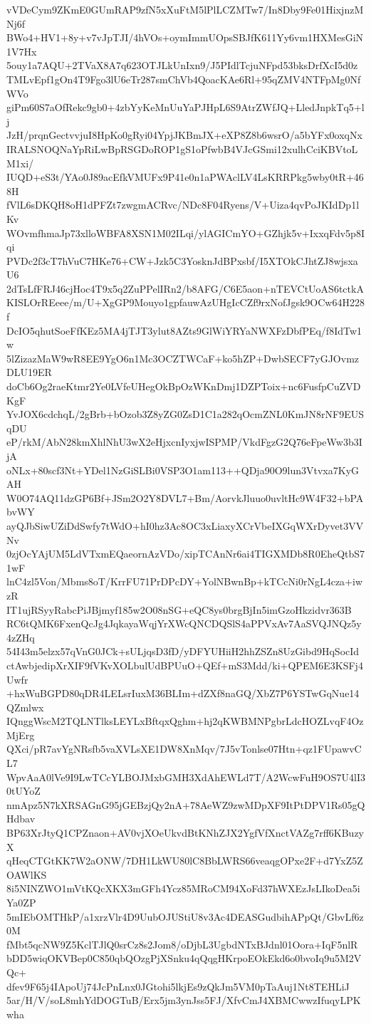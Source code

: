 vVDeCym9ZKmE0GUmRAP9zfN5xXuFtM5lPlLCZMTw7/In8Dby9Fe01HixjnzMNj6f
BWo4+HV1+8y+v7vJpTJI/4hVOs+oymImmUOpsSBJfK611Yy6vm1HXMesGiN1V7Hx
5ouy1a7AQU+2TVaX8A7q623OTJLkUnIxn9/J5PIdlTcjuNFpd53bksDrfXcI5d0z
TMLvEpf1gOn4T9Fgo3lU6eTr287smChVb4QoacKAe6Rl+95qZMV4NTFpMg0NfWVo
giPm60S7aOfRekc9gb0+4zbYyKeMnUuYaPJHpL6S9AtrZWfJQ+LledJnpkTq5+lj
JzH/prqnGectvvjuI8HpKo0gRyi04YpjJKBmJX+eXP8Z8b6wsrO/a5bYFx0oxqNx
IRALSNOQNaYpRiLwBpRSGDoROP1gS1oPfwbB4VJcGSmi12xulhCciKBVtoLM1xi/
IUQD+eS3t/YAo0J89acEfkVMUFx9P41e0n1aPWAclLV4LsKRRPkg5wby0tR+468H
fVlL6sDKQH8oH1dPFZt7zwgmACRvc/NDc8F04Ryens/V+Uiza4qvPoJKIdDp1lKv
WOvmfhmaJp73xlloWBFA8XSN1M02ILqi/ylAGICmYO+GZhjk5v+IxxqFdv5p8Iqi
PVDc2f3cT7hVuC7HKe76+CW+Jzk5C3YosknJdBPxsbf/I5XTOkCJhtZJ8wjsxaU6
2dTsLfFRJ46cjHoc4T9x5q2ZuPPelIRn2/b8AFG/C6E5aon+nTEVCtUoAS6tctkA
KISLOrREeee/m/U+XgGP9Mouyo1gpfauwAzUHgIcCZf9rxNofJgsk9OCw64H228f
DcIO5qhutSoeFfKEz5MA4jTJT3ylut8AZts9GlWiYRYaNWXFzDbfPEq/f8IdTw1w
5lZizazMaW9wR8EE9YgO6n1Mc3OCZTWCaF+ko5hZP+DwbSECF7yGJOvmzDLU19ER
doCb6Og2raeKtmr2Ye0LVfeUHegOkBpOzWKnDmj1DZPToix+nc6FusfpCuZVDKgF
YvJOX6cdchqL/2gBrb+bOzob3Z8yZG0ZsD1C1a282qOcmZNL0KmJN8rNF9EUSqDU
eP/rkM/AbN28kmXhlNhU3wX2eHjxcnIyxjwISPMP/VkdFgzG2Q76eFpeWw3b3IjA
oNLx+80scf3Nt+YDel1NzGiSLBi0VSP3O1am113++QDja90O9lun3Vtvxa7KyGAH
W0O74AQ11dzGP6Bf+JSm2O2Y8DVL7+Bm/AorvkJluuo0uvltHc9W4F32+bPAbvWY
ayQJbSiwUZiDdSwfy7tWdO+hI0hz3Ac8OC3xLiaxyXCrVbeIXGqWXrDyvet3VVNv
0zjOcYAjUM5LdVTxmEQaeornAzVDo/xipTCAnNr6ai4TIGXMDb8R0EheQtbS71wF
lnC4zl5Von/Mbms8oT/KrrFU71PrDPcDY+YolNBwnBp+kTCcNi0rNgL4cza+iwzR
IT1ujRSyyRabcPiJBjmyf185w2O08nSG+eQC8ys0brgBjIn5imGzoHkzidvr363B
RC6tQMK6FxenQcJg4JqkayaWqjYrXWcQNCDQSlS4aPPVxAv7AaSVQJNQz5y4zZHq
54I43m5elzx57qVnG0JCk+sULjqsD3fD/yDFYUHiiH2hhZSZn8UzGibd9HqSocId
ctAwbjedipXrXIF9fVKvXOLbulUdBPUuO+QEf+mS3Mdd/ki+QPEM6E3KSFj4Uwfr
+hxWuBGPD80qDR4LELsrIuxM36BLIm+dZXf8naGQ/XbZ7P6YSTwGqNue14QZmlwx
IQnggWscM2TQLNTlksLEYLxBftqxQghm+hj2qKWBMNPgbrLdcHOZLvqF4OzMjErg
QXci/pR7avYgNRsfb5vaXVLsXE1DW8XnMqv/7J5vTonlse07Htn+qz1FUpawvCL7
WpvAaA0lVe9I9LwTCcYLBOJMxbGMH3XdAhEWLd7T/A2WcwFuH9OS7U4lI30tUYoZ
nmApz5N7kXRSAGnG95jGEBzjQy2nA+78AeWZ9zwMDpXF9ItPtDPV1Rs05gQHdbav
BP63XrJtyQ1CPZnaon+AV0vjXOeUkvdBtKNhZJX2YgfVfXnctVAZg7rff6KBuzyX
qHeqCTGtKK7W2aONW/7DH1LkWU80lC8BbLWRS66veaqgOPxe2F+d7YxZ5ZOAWlKS
8i5NINZWO1mVtKQcXKX3mGFh4Ycz85MRoCM94XoFd37hWXEzJsLIkoDea5iYa0ZP
5mIEbOMTHkP/a1xrzVlr4D9UubOJUStiU8v3Ac4DEASGudbihAPpQt/GbvLf6z0M
fMbt5qcNW9Z5KclTJlQ0srCz8s2Jom8/oDjbL3UgbdNTxBJdnl01Oora+IqF5nlR
bDD5wiqOKVBep0C850qbQOzgPjXSnku4qQqgHKrpoEOkEkd6o0bvoIq9u5M2VQc+
dfev9F65j4IApoUj74JcPnLnx0JGtohi5lkjEs9zQkJm5VM0pTaAuj1Nt8TEHLiJ
5ar/H/V/soL8mhYdDOGTuB/Erx5jm3ynJss5FJ/XfvCmJ4XBMCwwzIfuqyLPKwha
